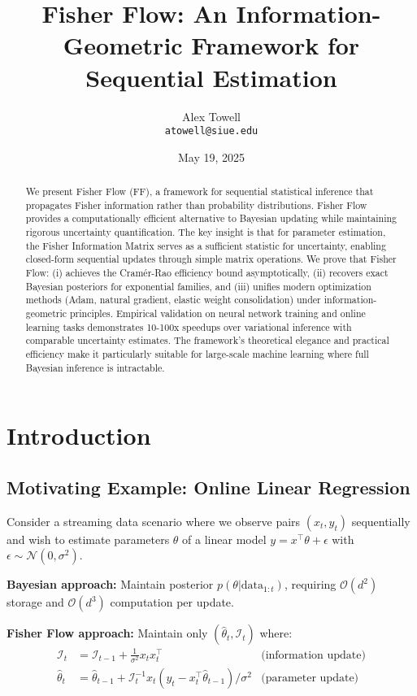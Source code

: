 \documentclass[11pt]{article}
\title{Fisher Flow: An Information-Geometric Framework for Sequential Estimation}
\author{Alex Towell \\ \texttt{atowell@siue.edu}}
\date{May 19, 2025}
\begin{document}
\maketitle

\begin{abstract}
We present Fisher Flow (FF), a framework for sequential statistical inference that propagates Fisher information rather than probability distributions. Fisher Flow provides a computationally efficient alternative to Bayesian updating while maintaining rigorous uncertainty quantification. The key insight is that for parameter estimation, the Fisher Information Matrix serves as a sufficient statistic for uncertainty, enabling closed-form sequential updates through simple matrix operations. We prove that Fisher Flow: (i) achieves the Cramér-Rao efficiency bound asymptotically, (ii) recovers exact Bayesian posteriors for exponential families, and (iii) unifies modern optimization methods (Adam, natural gradient, elastic weight consolidation) under information-geometric principles. Empirical validation on neural network training and online learning tasks demonstrates 10-100x speedups over variational inference with comparable uncertainty estimates. The framework's theoretical elegance and practical efficiency make it particularly suitable for large-scale machine learning where full Bayesian inference is intractable.
\end{abstract}

\section{Introduction}

\subsection{Motivating Example: Online Linear Regression}

Consider a streaming data scenario where we observe pairs $(x_t, y_t)$ sequentially and wish to estimate parameters $\theta$ of a linear model $y = x^\top\theta + \epsilon$ with $\epsilon \sim \mathcal{N}(0, \sigma^2)$. 

\textbf{Bayesian approach:} Maintain posterior $p(\theta|\text{data}_{1:t})$, requiring $\mathcal{O}(d^2)$ storage and $\mathcal{O}(d^3)$ computation per update.

\textbf{Fisher Flow approach:} Maintain only $(\hat{\theta}_t, \mathcal{I}_t)$ where:
\begin{align}
\mathcal{I}_t &= \mathcal{I}_{t-1} + \frac{1}{\sigma^2}x_t x_t^\top & \text{(information update)}\\
\hat{\theta}_t &= \hat{\theta}_{t-1} + \mathcal{I}_t^{-1}x_t(y_t - x_t^\top\hat{\theta}_{t-1})/\sigma^2 & \text{(parameter update)}
\end{align}
\end{document}
